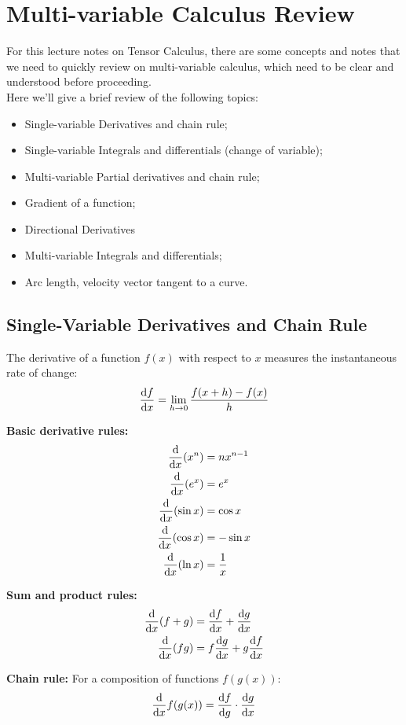 \section{Multi-variable Calculus Review}

For this lecture notes on Tensor Calculus, there are some concepts and notes that we need to quickly review on multi-variable calculus, which
need to be clear and understood before proceeding.\\
Here we'll give a brief review of the following topics:

\begin{itemize}
    \item Single-variable Derivatives and chain rule;
    \item Single-variable Integrals and differentials (change of variable);
    \item Multi-variable Partial derivatives and chain rule;
    \item Gradient of a function;
    \item Directional Derivatives
    \item Multi-variable Integrals and differentials;
    \item Arc length, velocity vector tangent to a curve.
\end{itemize}
\subsection{Single-Variable Derivatives and Chain Rule}

The derivative of a function $f(x)$ with respect to $x$ measures the instantaneous rate of change:
\[
\dv{f}{x} = \lim_{h \to 0} \frac{f(x+h) - f(x)}{h}
\]

\textbf{Basic derivative rules:}
\begin{align*}
\dv{x}(x^n) &= nx^{n-1} \\
\dv{x}(e^x) &= e^x \\
\dv{x}(\sin x) &= \cos x \\
\dv{x}(\cos x) &= -\sin x \\
\dv{x}(\ln x) &= \frac{1}{x}
\end{align*}

\textbf{Sum and product rules:}
\begin{align*}
\dv{x}(f + g) &= \dv{f}{x} + \dv{g}{x} \\
\dv{x}(fg) &= f\dv{g}{x} + g\dv{f}{x}
\end{align*}

\textbf{Chain rule:} For a composition of functions $f(g(x))$:
\[
\dv{x}f(g(x)) = \dv{f}{g} \cdot \dv{g}{x}
\]

